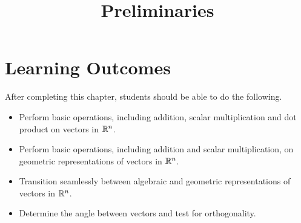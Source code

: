 \documentclass{ximera}
\title{Preliminaries}
\begin{document}
\begin{abstract}
\end{abstract}
 
\maketitle
 
\section*{Learning Outcomes}
After completing this chapter, students should be able to do the following.
 
\begin{itemize}
    \item Perform basic operations, including addition, scalar multiplication and dot product on vectors in $\mathbb{R}^n$.
    
    \item Perform basic operations, including addition and scalar multiplication, on geometric representations of vectors in $\mathbb{R}^n$.
    
    \item Transition seamlessly between algebraic and geometric representations of vectors in $\mathbb{R}^n$.
    
   \item  Determine the angle between vectors and test for orthogonality.
   
 \end{itemize}
 
\end{document}
